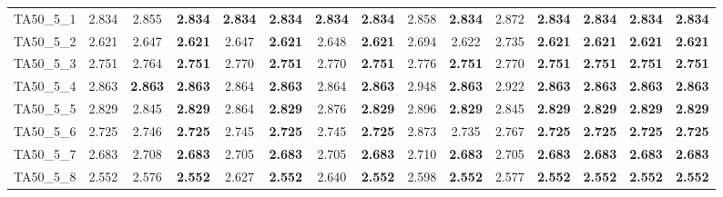 \begin{tabular}{cc||ccccccccccccc}
TA50\_5\_1         & 2.834            & 2.855            & {\bf 2.834}      & {\bf 2.834}      & {\bf 2.834}      & {\bf 2.834}      & {\bf 2.834}      & 2.858            & {\bf 2.834}      & 2.872            & {\bf 2.834}      & {\bf 2.834}      & {\bf 2.834}      & {\bf 2.834}     \\ 
TA50\_5\_2         & 2.621            & 2.647            & {\bf 2.621}      & 2.647            & {\bf 2.621}      & 2.648            & {\bf 2.621}      & 2.694            & 2.622            & 2.735            & {\bf 2.621}      & {\bf 2.621}      & {\bf 2.621}      & {\bf 2.621}     \\ 
TA50\_5\_3         & 2.751            & 2.764            & {\bf 2.751}      & 2.770            & {\bf 2.751}      & 2.770            & {\bf 2.751}      & 2.776            & {\bf 2.751}      & 2.770            & {\bf 2.751}      & {\bf 2.751}      & {\bf 2.751}      & {\bf 2.751}     \\ 
TA50\_5\_4         & 2.863            & {\bf 2.863}      & {\bf 2.863}      & 2.864            & {\bf 2.863}      & 2.864            & {\bf 2.863}      & 2.948            & {\bf 2.863}      & 2.922            & {\bf 2.863}      & {\bf 2.863}      & {\bf 2.863}      & {\bf 2.863}     \\ 
TA50\_5\_5         & 2.829            & 2.845            & {\bf 2.829}      & 2.864            & {\bf 2.829}      & 2.876            & {\bf 2.829}      & 2.896            & {\bf 2.829}      & 2.845            & {\bf 2.829}      & {\bf 2.829}      & {\bf 2.829}      & {\bf 2.829}     \\ 
TA50\_5\_6         & 2.725            & 2.746            & {\bf 2.725}      & 2.745            & {\bf 2.725}      & 2.745            & {\bf 2.725}      & 2.873            & 2.735            & 2.767            & {\bf 2.725}      & {\bf 2.725}      & {\bf 2.725}      & {\bf 2.725}     \\ 
TA50\_5\_7         & 2.683            & 2.708            & {\bf 2.683}      & 2.705            & {\bf 2.683}      & 2.705            & {\bf 2.683}      & 2.710            & {\bf 2.683}      & 2.705            & {\bf 2.683}      & {\bf 2.683}      & {\bf 2.683}      & {\bf 2.683}     \\ 
TA50\_5\_8         & 2.552            & 2.576            & {\bf 2.552}      & 2.627            & {\bf 2.552}      & 2.640            & {\bf 2.552}      & 2.598            & {\bf 2.552}      & 2.577            & {\bf 2.552}      & {\bf 2.552}      & {\bf 2.552}      & {\bf 2.552}     \\ 

\end{tabular}
